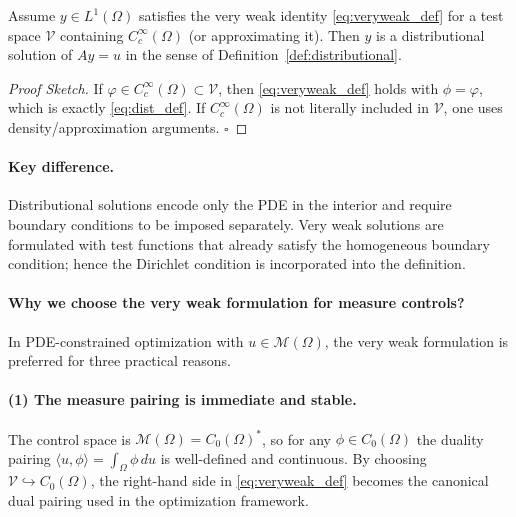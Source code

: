 \documentclass[11pt,a4paper]{article}
\begin{document}
\begin{proposition}\label{prop:vw_implies_dist}
Assume $y\in L^1(\Omega)$ satisfies the very weak identity \eqref{eq:veryweak_def} for a test space
$\mathcal{V}$ containing $C_c^\infty(\Omega)$ (or approximating it).
Then $y$ is a distributional solution of $Ay=u$ in the sense of Definition~\ref{def:distributional}.
\end{proposition}

\begin{proof}[Proof Sketch]
If $\varphi\in C_c^\infty(\Omega)\subset\mathcal{V}$, then \eqref{eq:veryweak_def} holds with $\phi=\varphi$,
which is exactly \eqref{eq:dist_def}.
If $C_c^\infty(\Omega)$ is not literally included in $\mathcal{V}$, one uses density/approximation arguments.
\hfill$\square$    
\end{proof}


\paragraph{Key difference.}
Distributional solutions encode only the PDE in the interior and require boundary conditions to be
imposed separately. Very weak solutions are formulated with test functions that already satisfy the
homogeneous boundary condition; hence the Dirichlet condition is incorporated into the definition.

\paragraph{Why we choose the very weak formulation for measure controls?}
In PDE-constrained optimization with $u\in\mathcal{M}(\Omega)$, the very weak formulation is preferred
for three practical reasons.

\paragraph{(1) The measure pairing is immediate and stable.}
The control space is $\mathcal{M}(\Omega)=C_0(\Omega)^*$, so for any $\phi\in C_0(\Omega)$ the duality pairing
$\langle u,\phi\rangle=\int_\Omega \phi\,du$ is well-defined and continuous.
By choosing $\mathcal{V}\hookrightarrow C_0(\Omega)$, the right-hand side in \eqref{eq:veryweak_def}
becomes the canonical dual pairing used in the optimization framework. \cite{ClasonKunisch2009}
\end{document}
